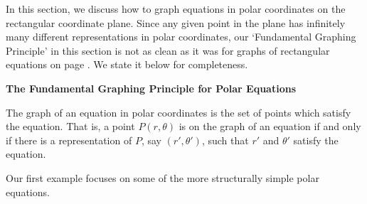 

\setcounter{footnote}{0}

\label{PolarGraphs}

In this section, we discuss how to graph equations in polar coordinates on the rectangular coordinate plane.  Since any given point in the plane has infinitely many different representations in polar coordinates, our `Fundamental Graphing Principle' in this section is not as clean as it was for graphs of rectangular equations on page \pageref{fgp}.  We state it below for completeness.

\medskip

\colorbox{ResultColor}{\bbm

\smallskip

\centerline{\textbf{The Fundamental Graphing Principle for Polar Equations}} 

\label{fgpp}

The graph of an equation in polar coordinates is the set of points which satisfy the equation.  That is, a point $P(r,\theta)$ is on the graph of an equation if and only if there is a representation of $P$, say $\left(r',\theta'\right)$, such that $r'$ and $\theta'$ satisfy the equation.

\smallskip

\ebm}

\medskip

Our first example focuses on some of the more structurally simple polar equations.


